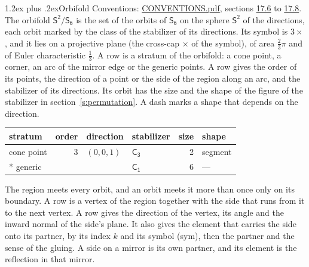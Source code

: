 \documentclass[10pt,a4paper]{article}
\makeatletter
\renewcommand\section{\@startsection{section}{1}{\z@}{-3ex plus -1ex minus -.2ex}%
  {1.2ex plus .2ex}{\normalfont\large\sffamily\bfseries\color{parttitle}}}
\numberwithin{equation}{section}
\newcommand{\grp}[1]{\mathsf{#1}}
\newcommand{\orbname}[1]{#1}
\newcommand{\dirvec}[3]{(#1, #2, #3)}
\newcommand{\twosphere}{\mathsf{S}^{2}}
\makeatother
\begin{document}
\section{Orbifold}\label{s:orbifold}
Conventions: \href{../../CONVENTIONS.pdf}{CONVENTIONS.pdf}, sections \href{../../CONVENTIONS.pdf\#conv.17.6}{17.6} to \href{../../CONVENTIONS.pdf\#conv.17.8}{17.8}.
The orbifold $\twosphere/\grp{S_{6}}$ is the set of the orbits of $\grp{S_{6}}$ on the sphere $\twosphere$ of the directions, each orbit marked by the class of the stabilizer of its directions. Its symbol is $\orbname{3{\times}}$, and it lies on a projective plane (the cross-cap ${\times}$ of the symbol), of area $\tfrac{2}{3}\pi$ and of Euler characteristic $\tfrac{1}{3}$.
\leavevmode\label{n:head.stratum}\label{n:head.order.point}\label{n:head.direction}\label{n:head.stabilizer}\label{n:head.size.orbit}\label{n:head.shape}A row is a stratum of the orbifold: a cone point, a corner, an arc of the mirror edge or the generic points. A row gives the order of its points, the direction of a point or the side of the region along an arc, and the stabilizer of its directions. Its orbit has the size and the shape of the figure of the stabilizer in section~\ref{s:permutation}. A dash marks a shape that depends on the direction.
{\small\setlength{\tabcolsep}{4pt}\begin{longtable}{@{}lrllrl@{}}\toprule
stratum & order & direction & stabilizer & size & shape\\\midrule\endhead
\bottomrule\endfoot\endlastfoot
cone point & 3 & $\dirvec{0}{0}{1}$ & \href{C3.pdf}{$\grp{C_{3}}$} & 2 & segment\\*
generic &  &  & \href{C1.pdf}{$\grp{C_{1}}$} & 6 & ---\\
\bottomrule\end{longtable}}
\leavevmode\label{n:head.vertex.region}\label{n:head.angle}\label{n:head.normal.side}\label{n:head.partner}\label{n:head.sense}The region meets every orbit, and an orbit meets it more than once only on its boundary. A row is a vertex of the region together with the side that runs from it to the next vertex. A row gives the direction of the vertex, its angle and the inward normal of the side's plane. It also gives the element that carries the side onto its partner, by its index $k$ and its symbol (sym), then the partner and the sense of the gluing. A side on a mirror is its own partner, and its element is the reflection in that mirror.
\end{document}
